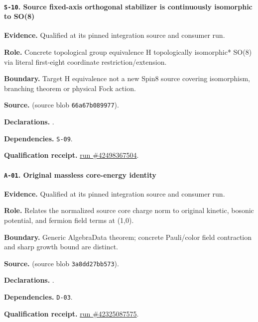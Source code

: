 \paragraph{\texttt{S-10}. Source fixed-axis orthogonal stabilizer is continuously isomorphic to SO(8)}
\noindent\textbf{Evidence.} Qualified at its pinned integration source and consumer run.
\par\noindent\textbf{Role.} Concrete topological group equivalence H topologically isomorphic* SO(8) via literal first-eight coordinate restriction/extension.
\par\noindent\textbf{Boundary.} Target H equivalence not a new Spin8 source covering isomorphism, branching theorem or physical Fock action.
\par\noindent\textbf{Source.}  (source blob \texttt{66a67b089977}).
\par\noindent\textbf{Declarations.} .
\par\noindent\textbf{Dependencies.} \texttt{S-09}.
\par\noindent\textbf{Qualification receipt.} \href{https://github.com/etblink/math/actions/runs/42498367504}{run \#42498367504}.
\medskip

\paragraph{\texttt{A-01}. Original massless core-energy identity}
\noindent\textbf{Evidence.} Qualified at its pinned integration source and consumer run.
\par\noindent\textbf{Role.} Relates the normalized source core charge norm to original kinetic, bosonic potential, and fermion field terms at (1,0).
\par\noindent\textbf{Boundary.} Generic AlgebraData theorem; concrete Pauli/color field contraction and sharp growth bound are distinct.
\par\noindent\textbf{Source.}  (source blob \texttt{3a8dd27bb573}).
\par\noindent\textbf{Declarations.} .
\par\noindent\textbf{Dependencies.} \texttt{D-03}.
\par\noindent\textbf{Qualification receipt.} \href{https://github.com/etblink/math/actions/runs/42325087575}{run \#42325087575}.
\medskip

